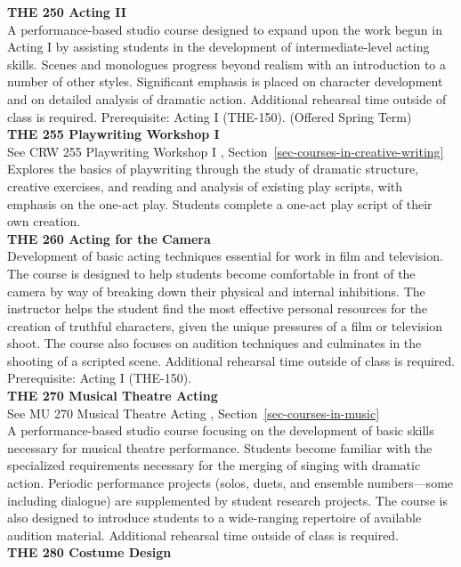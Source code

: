 \documentclass[
  letterpaper,
]{scrbook}
\begin{document}
\textbf{THE 250 Acting II}\\
A performance-based studio course designed to expand upon the work begun
in Acting I by assisting students in the development of
intermediate-level acting skills. Scenes and monologues progress beyond
realism with an introduction to a number of other styles. Significant
emphasis is placed on character development and on detailed analysis of
dramatic action. Additional rehearsal time outside of class is required.
Prerequisite: Acting I (THE-150). (Offered Spring Term)\\
\textbf{THE 255 Playwriting Workshop I}\\
See CRW 255 Playwriting Workshop I ,
Section~\ref{sec-courses-in-creative-writing}\\
Explores the basics of playwriting through the study of dramatic
structure, creative exercises, and reading and analysis of existing play
scripts, with emphasis on the one-act play. Students complete a one-act
play script of their own creation.\\
\textbf{THE 260 Acting for the Camera}\\
Development of basic acting techniques essential for work in film and
television. The course is designed to help students become comfortable
in front of the camera by way of breaking down their physical and
internal inhibitions. The instructor helps the student find the most
effective personal resources for the creation of truthful characters,
given the unique pressures of a film or television shoot. The course
also focuses on audition techniques and culminates in the shooting of a
scripted scene. Additional rehearsal time outside of class is required.
Prerequisite: Acting I (THE-150).\\
\textbf{THE 270 Musical Theatre Acting}\\
See MU 270 Musical Theatre Acting , Section~\ref{sec-courses-in-music}\\
A performance-based studio course focusing on the development of basic
skills necessary for musical theatre performance. Students become
familiar with the specialized requirements necessary for the merging of
singing with dramatic action. Periodic performance projects (solos,
duets, and ensemble numbers---some including dialogue) are supplemented
by student research projects. The course is also designed to introduce
students to a wide-ranging repertoire of available audition material.
Additional rehearsal time outside of class is required.\\
\textbf{THE 280 Costume Design}\\
\end{document}
